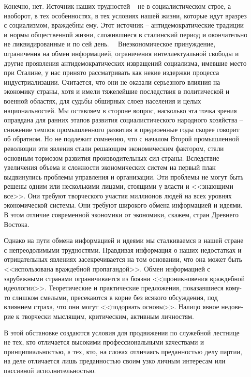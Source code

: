 \documentclass{book}
\begin{document}
Конечно, нет. Источник наших трудностей -- не в социалистическом строе, а наоборот, в тех особенностях, в тех условиях нашей 
жизни, которые идут вразрез с социализмом, враждебны ему. Этот источник -- антидемократические традиции и нормы общественной 
жизни, сложившиеся в сталинский период и окончательно не ликвидированные и по сей день.   Внеэкономическое принуждение, 
ограничения на обмен информацией, ограничения интеллектуальной свободы и другие проявления антидемократических извращений 
социализма, имевшие место при Сталине, у нас принято рассматривать как некие издержки процесса индустриализации. Считается, что 
они не оказали серьезного влияния на экономику страны, хотя и имели тяже­лейшие последствия в политической и военной областях, 
для судьбы обширных слоев населения и целых национальностей. Мы оставляем в стороне вопрос, насколько эта точка зрения оправдана 
для ранних этапов развития социалистического народ­ного хозяйства -- снижение темпов промышленного развития в предвоенные годы 
скорее говорит об обратном. Но не подле­жит сомнению, что с началом Второй промышленной револю­ции эти явления стали решающим 
экономическим фактором, стали основным тормозом развития производительных сил страны. Вследствие увеличения объема и сложности 
экономи­ческих систем на первый план выдвинулись проблемы управ­ления и организации. Эти проблемы не могут быть решены одним или 
несколькими лицами, стоящими у власти и <<знаю­щими все>>. Они требуют творческого участия миллионов людей на всех уровнях 
экономической системы. Они требуют широ­кого обмена информацией и идеями. В этом отличие современ­ной экономики от экономики, 
скажем, стран Древнего Востока.

Однако на пути обмена информацией и идеями мы сталки­ваемся в нашей стране с непреодолимыми трудностями. Прав­дивая информация о 
наших недостатках и отрицательных явле­ниях засекречивается на том основании, что она может быть <<использована враждебной 
пропагандой>>. Обмен информацией с зарубежными странами ограничивается из боязни <<проникно­вения враждебной идеологии>>. 
Теоретические и практические предложения, показавшиеся кому-то слишком смелыми, пресе­каются в корне без всякого обсуждения, под 
влиянием стра­ха, что они могут <<подорвать основы>>. Налицо явное недове­рие к творчески мыслящим, критическим, активным личнос­тям. 

В этой обстановке создаются условия для продвижения по служебной лестнице не тех, кто отличается высокими про­фессиональными 
качествами и принципиальностью, а тех, кто, на словах отличаясь преданностью делу партии, на деле отли­чается лишь преданностью 
своим узко личным интересам или пассивной исполнительностью.
\end{document}
